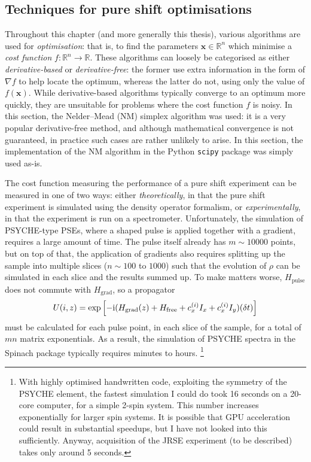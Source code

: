 \subsection{Techniques for pure shift optimisations}
\label{subsec:pureshift__optim_techniques}

Throughout this chapter (and more generally this thesis), various algorithms are used for \textit{optimisation}: that is, to find the parameters $\symbf{x} \in \mathbb{R}^n$ which minimise a \textit{cost function} $f : \mathbb{R}^n \to \mathbb{R}$.
These algorithms can loosely be categorised as either \textit{derivative-based} or \textit{derivative-free}: the former use extra information in the form of $\nabla f$ to help locate the optimum, whereas the latter do not, using only the value of $f(\symbf{x})$.
While derivative-based algorithms typically converge to an optimum more quickly, they are unsuitable for problems where the cost function $f$ is noisy.
In this section, the Nelder--Mead (NM) simplex algorithm\autocite{Nelder1965TCJ} was used: it is a very popular derivative-free method, and although mathematical convergence is not guaranteed\autocite{McKinnon1998SIAMJO}, in practice such cases are rather unlikely to arise.
In this section, the implementation of the NM algorithm in the Python \texttt{scipy} package was simply used as-is.

The cost function measuring the performance of a pure shift experiment can be measured in one of two ways: either \textit{theoretically}, in that the pure shift experiment is simulated using the density operator formalism, or \textit{experimentally}, in that the experiment is run on a spectrometer.
Unfortunately, the simulation of PSYCHE-type PSEs, where a shaped pulse is applied together with a gradient, requires a large amount of time.
The pulse itself already has $m \sim 10000$ points, but on top of that, the application of gradients also requires splitting up the sample into multiple slices ($n \sim 100$ to $1000$) such that the evolution of $\rho$ can be simulated in each slice and the results summed up.
To make matters worse, $H_\text{pulse}$ does not commute with $H_\text{grad}$, so a propagator
\begin{equation}
    \label{eq:pulse_gradient_propagator}
    U(i, z) = \exp\left[-\mathrm{i}(H_\text{grad}(z) + H_\text{free} + c_x^{(i)}I_x + c_x^{(i)} I_y)(\delta t)\right]
\end{equation}
must be calculated for each pulse point, in each slice of the sample, for a total of $mn$ matrix exponentials.
As a result, the simulation of PSYCHE spectra in the Spinach package\autocite{Hogben2011JMR} typically requires minutes to hours.%
\footnote{With highly optimised handwritten code, exploiting the symmetry of the PSYCHE element, the fastest simulation I could do took 16 seconds on a 20-core computer, for a simple 2-spin system. This number increases exponentially for larger spin systems. It is possible that GPU acceleration could result in substantial speedups, but I have not looked into this sufficiently. Anyway, acquisition of the JRSE experiment (to be described) takes only around 5 seconds.}

